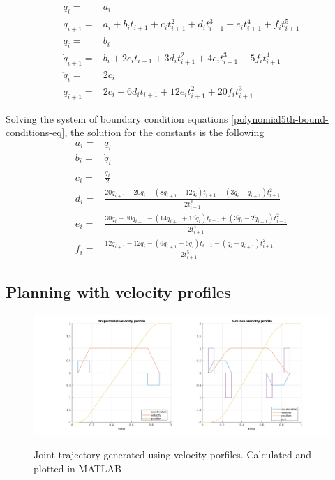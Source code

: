 \begin{equation}
\label{polynomial5th-bound-conditions-eq}
\begin{aligned}
q_i ={}& a_i \\
q_{i+1} ={}& a_i + b_it_{i+1} + c_it_{i+1}^2 + d_it_{i+1}^3 + e_it_{i+1}^4 + f_it_{i+1}^5 \\
\dot{q}_i ={}& b_i \\ 
\dot{q}_{i+1} ={}& b_i + 2c_it_{i+1} + 3d_it_{i+1}^2 + 4e_it_{i+1}^3 + 5f_it_{i+1}^4 \\
\ddot{q}_i ={}& 2c_i \\
\ddot{q}_{i+1} ={}& 2c_i + 6d_it_{i+1} + 12e_it_{i+1}^2 + 20f_it_{i+1}^3
\end{aligned}
\end{equation}

Solving the system of boundary condition equations \ref{polynomial5th-bound-conditions-eq}, the solution for the constants is the following
\begin{equation}
\begin{aligned}
a_i ={}& q_i \\
b_i ={}& \dot{q}_i \\
c_i ={}& \frac{\ddot{q}_i}{2} \\
d_i ={}& \frac{20q_{i+1} - 20q_i - (8\dot{q}_{i+1} + 12\dot{q}_i)t_{i+1} - (3\ddot{q}_i - \ddot{q}_{i+1})t_{i+1}^2 }{2t_{i+1}^3} \\
e_i ={}& \frac{30q_i - 30q_{i+1} - (14\dot{q}_{i+1} + 16\dot{q}_i)t_{i+1} + (3\ddot{q}_i - 2\ddot{q}_{i+1})t_{i+1}^2}{2t_{i+1}^4} \\
f_i ={}& \frac{12q_{i+1} - 12q_i - (6\dot{q}_{i+1} + 6\dot{q}_i)t_{i+1} - (\ddot{q}_i - \ddot{q}_{i+1})t_{i+1}^2 }{2t_{i+1}^5}
\end{aligned}
\end{equation}


\subsection{Planning with velocity profiles}

\begin{center}
\begin{figure}[H]
\centering
\includegraphics[width=\textwidth]{images/vel-profiles.png}\\
\caption{Joint trajectory generated using velocity porfiles. Calculated and plotted in MATLAB} 
\end{figure}
\end{center}